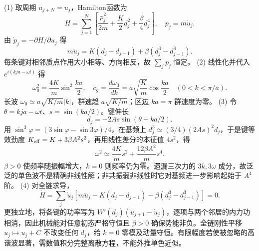 (1) 取周期 \(u_{j+N}=u_j\)，Hamilton函数为
\[
H=\sum_{j=1}^N\left[\frac{p_j^2}{2m}+\frac K2d_j^2+\frac\beta4d_j^4\right],\quad p_j=m\dot u_j.
\]
由 \(\dot p_j=-\partial H/\partial u_j\) 得
\[
m\ddot u_j=K(d_j-d_{j-1})+\beta(d_j^3-d_{j-1}^3).
\]
每条键对相邻质点作用大小相等、方向相反，故 \(\sum_j p_j\) 恒定。
(2) 线性化并代入 \(e^{i(kja-\omega t)}\) 得
\[
\omega_0^2=\frac{4K}{m}\sin^2\frac{ka}{2},\quad
c_g=\frac{d\omega_0}{dk}=a\sqrt{\frac Km}\cos\frac{ka}{2}
\quad(0<k<\pi/a).
\]
长波 \(\omega_0\simeq a\sqrt{K/m}|k|\)，群速趋 \(a\sqrt{K/m}\)；区边 \(ka=\pi\) 群速度为零。
(3) 令 \(\theta=kja-\omega t\)、\(s=\sin(ka/2)\)。键伸长
\[
d_j=-2A s\sin(\theta+ka/2).
\]
用 \(\sin^3\varphi=(3\sin\varphi-\sin3\varphi)/4\)，在基频上 \(d_j^3\simeq(3/4)(2As)^2d_j\)，于是键等效劲度 \(K_{\rm eff}=K+3\beta A^2s^2\)，再用线性差分的本征值 \(4s^2\)，得
\[
\boxed{\omega^2\simeq\frac{4K}{m}s^2+\frac{12\beta A^2}{m}s^4}.
\]
\(\beta>0\) 使频率随振幅增大，\(k=0\) 则频率仍为零。遗漏三次力的 \(3k,3\omega\) 成分，故泛泛的单色波不是精确非线性解；非共振弱非线性时它对基频进一步影响起始于 \(A^4\) 阶。
(4) 对全链求导，
\[
\dot H=\sum_j\dot u_j\left[m\ddot u_j-K(d_j-d_{j-1})-\beta(d_j^3-d_{j-1}^3)\right]=0.
\]
更独立地，将各键的功率写为 \(W'(d_j)(\dot u_{j+1}-\dot u_j)\)，逐项与两个邻居的内力功相消，因此机械能对任意初态严格守恒且 \(\beta>0\) 确保势能非负。全链刚性平移 \(u_j\mapsto u_j+C\) 不改变任何 \(d_j\)，给 \(k=0\) 零模及动量守恒。有限幅度若使被忽略的高谐波显著，需数值积分完整离散方程，不能外推单色近似。
